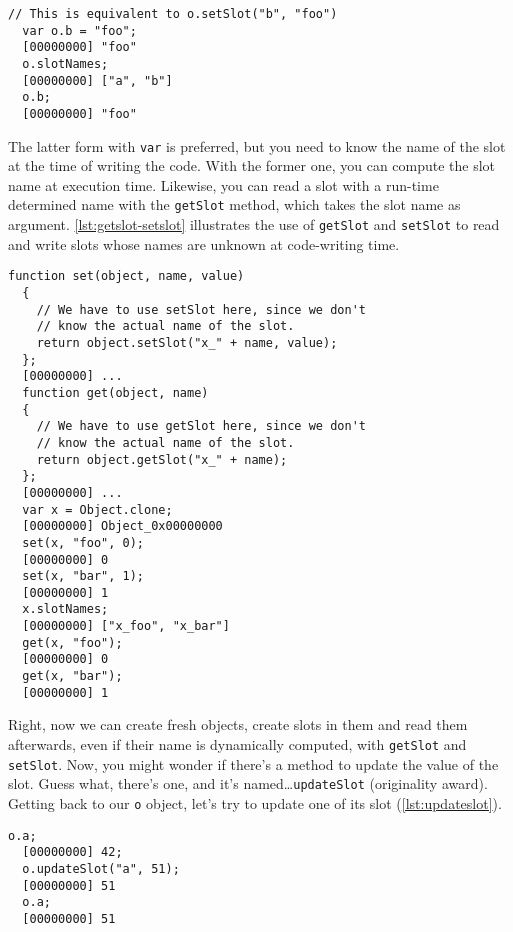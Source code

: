 \documentclass[openright,twoside,12pt]{report}
\begin{document}
\begin{lstlisting}[caption=Defining slots with var, label=lst:setslot-var]
  // This is equivalent to o.setSlot("b", "foo")
  var o.b = "foo";
  [00000000] "foo"
  o.slotNames;
  [00000000] ["a", "b"]
  o.b;
  [00000000] "foo"
\end{lstlisting}

The latter form with \texttt{var} is preferred, but you need to know
the name of the slot at the time of writing the code. With the former
one, you can compute the slot name at execution time. Likewise, you
can read a slot with a run-time determined name with the
\texttt{getSlot} method, which takes the slot name as
argument. \autoref{lst:getslot-setslot} illustrates the use of
\texttt{getSlot} and \texttt{setSlot} to read and write slots whose
names are unknown at code-writing time.


\begin{lstlisting}[caption=Dynamic slots with getSlot and setSlot,
  label=lst:getslot-setslot]
  function set(object, name, value)
  {
    // We have to use setSlot here, since we don't
    // know the actual name of the slot.
    return object.setSlot("x_" + name, value);
  };
  [00000000] ...
  function get(object, name)
  {
    // We have to use getSlot here, since we don't
    // know the actual name of the slot.
    return object.getSlot("x_" + name);
  };
  [00000000] ...
  var x = Object.clone;
  [00000000] Object_0x00000000
  set(x, "foo", 0);
  [00000000] 0
  set(x, "bar", 1);
  [00000000] 1
  x.slotNames;
  [00000000] ["x_foo", "x_bar"]
  get(x, "foo");
  [00000000] 0
  get(x, "bar");
  [00000000] 1
\end{lstlisting}

Right, now we can create fresh objects, create slots in them and read
them afterwards, even if their name is dynamically computed, with
\texttt{getSlot} and \texttt{setSlot}. Now, you might wonder if
there's a method to update the value of the slot. Guess what, there's
one, and it's named\ldots \texttt{updateSlot} (originality
award). Getting back to our \texttt{o} object, let's try to update one
of its slot (\autoref{lst:updateslot}).

\begin{lstlisting}[caption=Updating a slot, label=lst:updateslot]
  o.a;
  [00000000] 42;
  o.updateSlot("a", 51);
  [00000000] 51
  o.a;
  [00000000] 51
\end{lstlisting}
\end{document}
